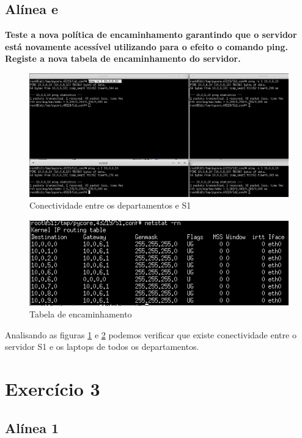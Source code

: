 \documentclass[a4paper]{report}
\begin{document}
\subsection{Alínea e}
\textbf{Teste a nova política de encaminhamento garantindo que o servidor está
novamente acessível utilizando para o efeito o comando ping. Registe a nova
tabela de encaminhamento do servidor.}

\begin{figure}[H]
    \centering 
    \includegraphics[width=\textwidth]{images/conectividadeDep.png}
    \caption{Conectividade entre os departamentos e S1}
    \label{fig:conectividadeDep}
\end{figure}

\begin{figure}[H]
    \centering 
    \includegraphics[width=\textwidth]{images/tabS1.png}
    \caption{Tabela de encaminhamento}
    \label{fig:tabS1}
\end{figure}

Analisando as figuras \ref{fig:conectividadeDep} e \ref{fig:tabS1} podemos verificar que
existe conectividade entre o servidor S1 e os laptops de todos os departamentos.

\section{Exercício 3}

\subsection{Alínea 1}
\end{document}
